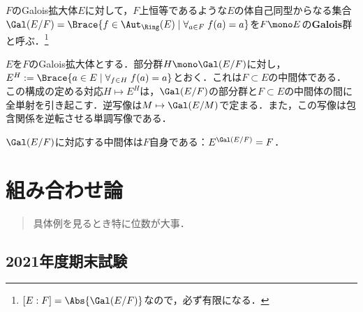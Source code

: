 \documentclass[uplatex,dvipdfmx]{jsreport}
\begin{document}
\begin{definition}
    $F$のGalois拡大体$E$に対して，$F$上恒等であるような$E$の体自己同型からなる集合$\Gal(E/F)=\Brace{f\in\Aut_\Ring(E)\mid\forall_{a\in F}\;f(a)=a}$を$F\mono E$の\textbf{Galois}群と呼ぶ．\footnote{$[E:F]=\Abs{\Gal(E/F)}$なので，必ず有限になる．}
\end{definition}

\begin{theorem}[Galois理論の基本定理]
    $E$を$F$のGalois拡大体とする．部分群$H\mono\Gal(E/F)$に対し，$E^H:=\Brace{a\in E\mid\forall_{f\in H}\;f(a)=a}$とおく．これは$F\subset E$の中間体である．
    この構成の定める対応$H\mapsto E^H$は，$\Gal(E/F)$の部分群と$F\subset E$の中間体の間に全単射を引き起こす．逆写像は$M\mapsto\Gal(E/M)$で定まる．また，この写像は包含関係を逆転させる単調写像である．
\end{theorem}
\begin{remarks}
    $\Gal(E/F)$に対応する中間体は$F$自身である：$E^{\Gal(E/F)}=F$．
\end{remarks}

\chapter{組み合わせ論}

\begin{quotation}
    具体例を見るとき特に位数が大事．
\end{quotation}

\section{2021年度期末試験}
\end{document}
